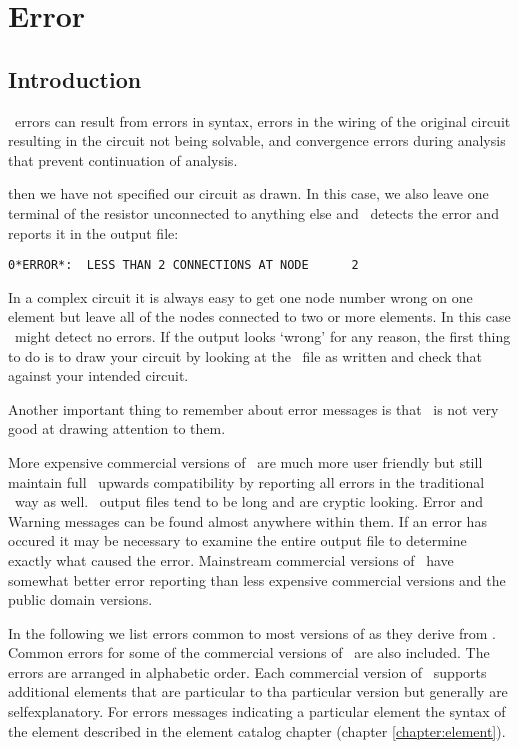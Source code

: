 \chapter{Error\label{chapter:error}}

\section{Introduction}

\spice\ errors can result from errors in syntax, errors in the wiring
of the original circuit resulting in the circuit not being solvable,
and convergence errors during analysis that prevent continuation of
analysis.

\noindent then we have not specified our circuit as drawn.  In this case, we also
leave one terminal of the resistor unconnected to anything else
and \spice\ detects the error and reports it in the output file:
\begin{verbatim}
0*ERROR*:  LESS THAN 2 CONNECTIONS AT NODE      2
\end{verbatim}
In a complex circuit it is always easy
to get one node number wrong on one element but leave all of the nodes connected
to two or more elements.  In this case \spice\ might detect no errors.  If the
output looks `wrong' for any reason, the first thing to do is 
to draw your circuit by looking at the \spice\ file as written and check
that against your intended circuit.

Another important thing to remember about error messages is that \justspice\
is not very good at drawing attention to them.

More expensive commercial versions of \justspice\ are much more user friendly but
still maintain full
\justspice\ upwards compatibility by reporting all errors in the traditional
\justspice\ way as well.
\justspice\ output files 
tend to be long and are cryptic looking.  Error and Warning messages
can be found almost anywhere within them.  If an error has occured it may be
necessary to examine the entire output file to determine exactly what caused
the error.
Mainstream commercial versions of \justspice\ have somewhat better error reporting
than less expensive commercial versions and the public domain versions.

In the following we list errors common to most versions of \spice as they derive
from \spicetwo.  Common errors for some of the commercial versions of
\justspice\ are also included. The errors are arranged in alphabetic order.
Each commercial version of \spice\ supports additional elements
that are particular to tha particular version but generally are selfexplanatory.
For errors messages indicating a particular element the syntax of the element
described in the element catalog chapter (chapter \ref{chapter:element}).


